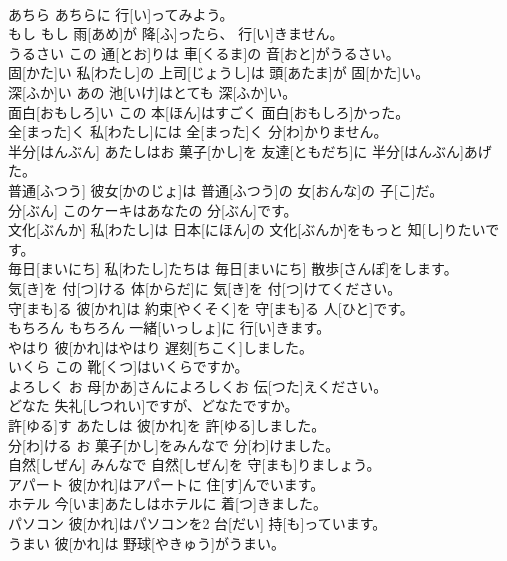\documentclass[8pt]{extreport}
\begin{document}
\begin{CJK}{UTF8}{min}
\\	あちら	あちらに 行[い]ってみよう。		
\\	もし	もし 雨[あめ]が 降[ふ]ったら、 行[い]きません。		
\\	うるさい	この 通[とお]りは 車[くるま]の 音[おと]がうるさい。		
\\	固[かた]い	私[わたし]の 上司[じょうし]は 頭[あたま]が 固[かた]い。		
\\	深[ふか]い	あの 池[いけ]はとても 深[ふか]い。		
\\	面白[おもしろ]い	この 本[ほん]はすごく 面白[おもしろ]かった。		
\\	全[まった]く	私[わたし]には 全[まった]く 分[わ]かりません。		
\\	半分[はんぶん]	あたしはお 菓子[かし]を 友達[ともだち]に 半分[はんぶん]あげた。		
\\	普通[ふつう]	彼女[かのじょ]は 普通[ふつう]の 女[おんな]の 子[こ]だ。		
\\	分[ぶん]	このケーキはあなたの 分[ぶん]です。		
\\	文化[ぶんか]	私[わたし]は 日本[にほん]の 文化[ぶんか]をもっと 知[し]りたいです。		
\\	毎日[まいにち]	私[わたし]たちは 毎日[まいにち] 散歩[さんぽ]をします。		
\\	気[き]を 付[つ]ける	体[からだ]に 気[き]を 付[つ]けてください。		
\\	守[まも]る	彼[かれ]は 約束[やくそく]を 守[まも]る 人[ひと]です。		
\\	もちろん	もちろん 一緒[いっしょ]に 行[い]きます。		
\\	やはり	彼[かれ]はやはり 遅刻[ちこく]しました。		
\\	いくら	この 靴[くつ]はいくらですか。		
\\	よろしく	お 母[かあ]さんによろしくお 伝[つた]えください。		
\\	どなた	失礼[しつれい]ですが、どなたですか。		
\\	許[ゆる]す	あたしは 彼[かれ]を 許[ゆる]しました。		
\\	分[わ]ける	お 菓子[かし]をみんなで 分[わ]けました。		
\\	自然[しぜん]	みんなで 自然[しぜん]を 守[まも]りましょう。		
\\	アパート	彼[かれ]はアパートに 住[す]んでいます。		
\\	ホテル	今[いま]あたしはホテルに 着[つ]きました。		
\\	パソコン	彼[かれ]はパソコンを2 台[だい] 持[も]っています。		
\\	うまい	彼[かれ]は 野球[やきゅう]がうまい。		

\end{CJK}
\end{document}
